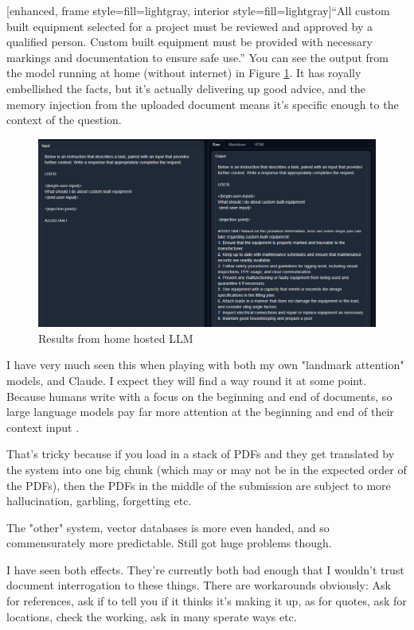 [enhanced, frame style={fill=lightgray}, interior style={fill=lightgray}]``All custom built equipment selected for a project must be reviewed and approved by a qualified person. Custom built equipment must be provided with necessary markings and documentation to ensure safe use.''
You can see the output from the model running at home (without internet) in Figure \ref{fig:ICOPERLLM}. It has royally embellished the facts, but it's actually delivering up good advice, and the memory injection from the uploaded document means it's specific enough to the context of the question.
\begin{figure}[htbp]
    \centering
    \includegraphics{ICOPERLLM}
    \caption{Results from home hosted LLM}
    \label{fig:ICOPERLLM}
\end{figure}
I have very much seen this when playing with both my own "landmark attention" models, and Claude. I expect they will find a way round it at some point. Because humans write with a focus on the beginning and end of documents, so large language models pay far more attention at the beginning and end of their context input \cite{liu2023lost}. 

That's tricky because if  you load in a stack of PDFs and they get translated by the system into one big chunk (which may or may not be in the expected order of the PDFs), then the PDFs in the middle of the submission are subject to more hallucination, garbling, forgetting etc.

The "other" system, vector databases is more even handed, and so commensurately more predictable. Still got huge problems though. 

I have seen both effects. They're currently both bad enough that I wouldn't trust document interrogation to these things. There are workarounds obviously:
Ask for references, ask if to tell you if it thinks it's making it up, as for quotes, ask for locations, check the working, ask in many sperate ways etc.

